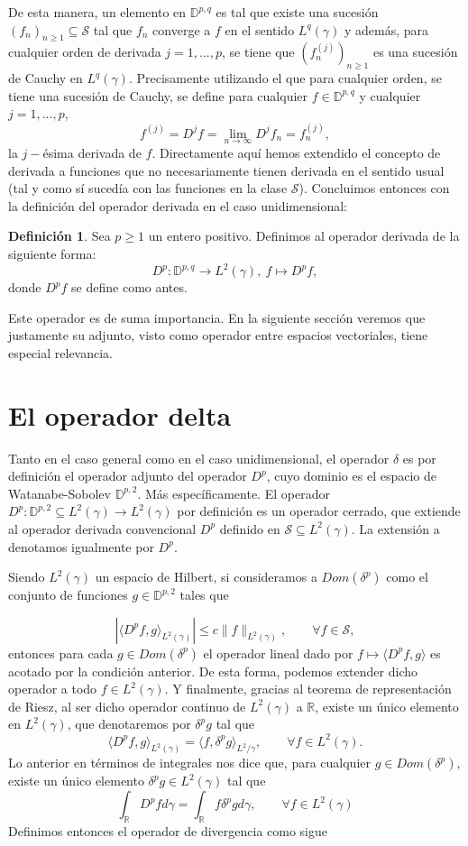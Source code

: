 \documentclass[letterpaper,twoside]{book}
\newcommand{\R}{\mathbb{R}}
\newcommand{\1}{\mathds{1}}
\newcommand{\abs}[1]{\left\lvert #1 \right\rvert}
\renewcommand{\to}{\rightarrow}
\theoremstyle{definition}
\newtheorem{dfn}{Definición}
\theoremstyle{definition}
\theoremstyle{definition}
\theoremstyle{definition}
\theoremstyle{definition}
\theoremstyle{definition}
\theoremstyle{definition}
\begin{document}
De esta manera, un elemento en $\mathbb{D}^{p,q}$ es tal que existe una sucesión $(f_n)_{n\geq1}\subseteq \mathcal{S}$ tal que $f_n$ converge a $f$ en el sentido $L^{q}(\gamma)$ y además, para cualquier orden de derivada $j=1,...,p$, se tiene que $(f_n^{(j)})_{n\geq1}$ es una sucesión de Cauchy en $L^{q}(\gamma)$. Precisamente utilizando el que para cualquier orden, se tiene una sucesión de Cauchy, se define para cualquier $f\in \mathbb{D}^{p,q}$ y cualquier $j=1,...,p$, 
\[
f^{(j)}=D^jf=\lim_{n\to\infty}D^{j}f_n=f_n^{(j)},
\]
la $j-$ésima derivada de $f$. Directamente aquí hemos extendido el concepto de derivada a funciones que no necesariamente tienen derivada en el sentido usual (tal y como sí sucedía con las funciones en la clase $\mathcal{S}$). Concluimos entonces con la definición del operador derivada en el caso unidimensional:
\begin{dfn}
    Sea $p\geq1$ un entero positivo. Definimos al operador derivada de la siguiente forma: 
    \[
    D^p:\mathbb{D}^{p,q}\longrightarrow L^{2}(\gamma), \ f\longmapsto D^{p}f,    
    \]
    donde $D^{p}f$ se define como antes. 
\end{dfn}
Este operador es de suma importancia. En la siguiente sección veremos que justamente su adjunto, visto como operador entre espacios vectoriales, tiene especial relevancia.



\section{El operador delta}

Tanto en el caso general como en el caso unidimensional, el operador $\delta$ es por definición el operador adjunto del operador $D^{p}$, cuyo dominio es el espacio de Watanabe-Sobolev $\mathbb{D}^{p,2}$. Más específicamente. El operador $D^{p}:\mathbb{D}^{p,2}\subseteq L^2(\gamma)\longrightarrow L^2(\gamma)$ por definición es un operador cerrado, que extiende al operador derivada convencional $D^{p}$ definido en $\mathcal{S}\subseteq L^2(\gamma)$. La extensión a denotamos igualmente por $D^{p}.$

Siendo $L^{2}(\gamma)$ un espacio de Hilbert, si consideramos a $Dom(\delta^{p})$ como el conjunto de funciones $g\in \mathbb{D}^{p,2}$ tales que

\[
\abs{\langle D^{p}f,g\rangle_{L^2(\gamma)}}\leq c\|f\|_{L^2(\gamma)}, \qquad \forall f\in \mathcal{S},
\]
entonces para cada $g\in Dom(\delta^{p})$ el operador lineal dado por $f\longmapsto \langle D^{p}f,g\rangle$ es acotado por la condición anterior. De esta forma, podemos extender dicho operador a todo $f\in L^2(\gamma)$. Y finalmente, gracias al teorema de representación de Riesz, al ser dicho operador continuo de $L^{2}(\gamma) $ a $\R$, existe un único elemento en $L^2(\gamma)$, que denotaremos por $\delta^{p}g$ tal que 
\[
\langle D^pf,g\rangle_{L^2(\gamma)}=\langle f,\delta^p g\rangle_{L^2/\gamma}, \qquad \forall f\in L^2(\gamma).
\]
 Lo anterior en términos de integrales nos dice que, para cualquier $g\in Dom(\delta^p)$, existe un único elemento $\delta^p g\in L^2(\gamma)$ tal que 
 \[
  \int_\R D^{p}fd\gamma=\int_\R f\delta^{p}gd\gamma, \qquad \forall f\in L^2(\gamma)  
 \]
 Definimos entonces el operador de divergencia como sigue
\end{document}

